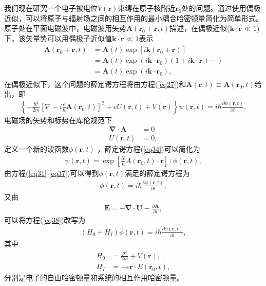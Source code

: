 我们现在研究一个电子被电位$V(\bm{r})$束缚在原子核附近$\bm{r}_0$处的问题。通过使用偶极近似，可以将原子与辐射场之间的相互作用的最小耦合哈密顿量简化为简单形式。原子处在平面电磁波中，电磁波用矢势$\bm{A}(\bm{r}_0+\bm{r},t)$描述，在偶极近似($\bm{k} \cdot\bm{ r} \ll 1$)下\cite{cc1998roc}，该矢量势可以用偶极子近似值$\bm{k}·\bm{r} \ll 1$表示
\begin{align}\label{eq33}
  \begin{split}
     \bm{A}({\bm{r}_0} + \bm{r},t)& = \bm{A}(t)\exp [i\bm{k}({\bm{r}_0} + \bm{r})]\\
                   &= \bm{A}(t)\exp (i\bm{k} \cdot {\bm{r}_0})(1 + i\bm{k} \cdot \bm{r} +  \cdots )\\
                   &= \bm{A}(t)\exp (i\bm{k} \cdot {\bm{r}_0}),
  \end{split}
\end{align}
在偶极近似下，这个问题的薛定谔方程将由方程(\ref{eq27})和$\bm{A}(\bm{r},t) \equiv \bm{A}(\bm{r}_0,t)$给出，即
\begin{align}
\left\{ { - \frac{{{\hbar ^2}}}{{2m}}{{\left[ {\nabla  - i\frac{e}{\hbar }\bm{A}(\bm{r}_0,t)} \right]}^2} + eU(\bm{r},t) + V(\bm{r})} \right\}\psi(\bm{r},t)  = i\hbar \frac{{\partial \psi(\bm{r},t) }}{{\partial t}},\label{eq34}
\end{align}
电磁场的矢势和标势在库伦规范\cite{griffiths2005introduction}下
\begin{align}
\bm{\nabla}  \cdot \bm{A} &= 0\label{eq35}\\
         U(\bm{r},t) &= 0,\label{eq36}
\end{align}
定义一个新的波函数$\phi(\bm{r},t)$ ，薛定谔方程(\ref{eq34})可以简化为
\begin{align}
\psi (\bm{r},t) = \exp [\frac{{ie}}{\hbar }A({\bm{r}_0},t) \cdot \bm{r}] \cdot \phi (\bm{r},t),\label{eq37}
\end{align}
由方程(\ref{eq31}-\ref{eq37})可以得到$\phi(\bm{r},t)$满足的薛定谔方程为
\begin{align}
[ - \frac{{{\hbar ^2}}}{{2m}} + V(\bm{r})]\phi (\bm{r},t) = i\hbar \frac{{\partial \phi (\bm{r},t)}}{{\partial t}},\label{eq38}
\end{align}
又由
\begin{align}
\bm{E} =  -\bm{ \nabla} \cdot\bm{ U }- \frac{{\partial \bm{A}}}{{\partial t}},\label{eq39}
\end{align}
可以将方程(\ref{eq38})改写为
\begin{align}
({H_0} + {H_I})\phi (\bm{r},t) = i\hbar \frac{{\partial \phi (\bm{r},t)}}{{\partial t}},\label{eq40}
\end{align}
其中
\begin{align}
{H_0} &= \frac{{{p^2}}}{{2m}} + V(\bm{r}),\label{eq41}\\
{H_I} &=  - e\bm{r} \cdot E({\bm{r}_0},t),\label{eq42}
\end{align}
分别是电子的自由哈密顿量和系统的相互作用哈密顿量。

